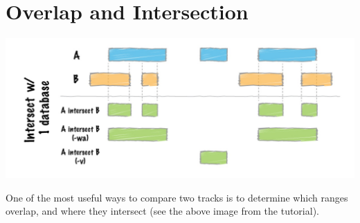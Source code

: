 \documentclass[10pt]{article}
\begin{document}

\section{Overlap and Intersection}
\includegraphics{fig/intersect.jpg}

One of the most useful ways to compare two tracks is to determine
which ranges overlap, and where they intersect (see the above image
from the  tutorial).
\end{document}
